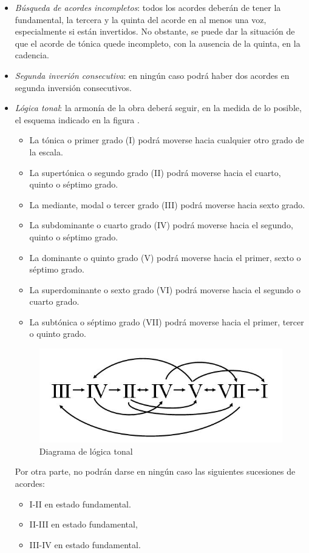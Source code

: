 \begin{itemize}
	\item \textit{Búsqueda de acordes incompletos}: todos los acordes deberán de tener la fundamental, la tercera y la quinta del acorde en al menos una voz, especialmente si están invertidos. No obstante, se puede dar la situación de que el acorde de tónica quede incompleto, con la ausencia de la quinta, en la cadencia.

	\item \textit{Segunda inverión consecutiva}: en ningún caso podrá haber dos acordes en segunda inversión consecutivos.

	\item \textit{Lógica tonal}: la armonía de la obra deberá seguir, en la medida de lo posible, el esquema indicado en la figura .

		\begin{itemize}

			\item La tónica o primer grado (I) podrá moverse hacia cualquier otro grado de la escala.
			\item La supertónica o segundo grado (II) podrá moverse hacia el cuarto, quinto o séptimo grado.
			\item La mediante, modal o tercer grado (III) podrá moverse hacia sexto grado.
			\item La subdominante o cuarto grado (IV) podrá moverse hacia el segundo, quinto o séptimo grado.
			\item La dominante o quinto grado (V) podrá moverse hacia el primer, sexto o séptimo grado.
			\item La superdominante o sexto grado (VI) podrá moverse hacia el segundo o cuarto grado.
			\item La subtónica o séptimo grado (VII) podrá moverse hacia el primer, tercer o quinto grado.
		\end{itemize}

		\begin{figure}[H]
			\centering
			\includegraphics[scale=0.7]{imagenes/logica.jpg}
			\caption{Diagrama de lógica tonal}
			\label{fig2.1.7}
		\end{figure}

		Por otra parte, no podrán darse en ningún caso las siguientes sucesiones de acordes:

		\begin{itemize}
			\item I-II en estado fundamental.
			\item II-III en estado fundamental,
			\item III-IV en estado fundamental.
		\end{itemize}

\end{itemize}

